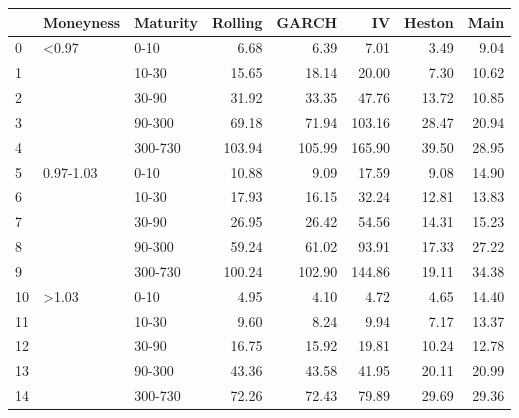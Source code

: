 \begin{tabular}{lllrrrrr}
\toprule
{} &  Moneyness & Maturity &  Rolling &   GARCH &      IV &  Heston &   Main \\
\midrule
0  &      <0.97 &     0-10 &     6.68 &    6.39 &    7.01 &    3.49 &   9.04 \\
1  &            &    10-30 &    15.65 &   18.14 &   20.00 &    7.30 &  10.62 \\
2  &            &    30-90 &    31.92 &   33.35 &   47.76 &   13.72 &  10.85 \\
3  &            &   90-300 &    69.18 &   71.94 &  103.16 &   28.47 &  20.94 \\
4  &            &  300-730 &   103.94 &  105.99 &  165.90 &   39.50 &  28.95 \\
5  &  0.97-1.03 &     0-10 &    10.88 &    9.09 &   17.59 &    9.08 &  14.90 \\
6  &            &    10-30 &    17.93 &   16.15 &   32.24 &   12.81 &  13.83 \\
7  &            &    30-90 &    26.95 &   26.42 &   54.56 &   14.31 &  15.23 \\
8  &            &   90-300 &    59.24 &   61.02 &   93.91 &   17.33 &  27.22 \\
9  &            &  300-730 &   100.24 &  102.90 &  144.86 &   19.11 &  34.38 \\
10 &      >1.03 &     0-10 &     4.95 &    4.10 &    4.72 &    4.65 &  14.40 \\
11 &            &    10-30 &     9.60 &    8.24 &    9.94 &    7.17 &  13.37 \\
12 &            &    30-90 &    16.75 &   15.92 &   19.81 &   10.24 &  12.78 \\
13 &            &   90-300 &    43.36 &   43.58 &   41.95 &   20.11 &  20.99 \\
14 &            &  300-730 &    72.26 &   72.43 &   79.89 &   29.69 &  29.36 \\
\bottomrule
\end{tabular}
